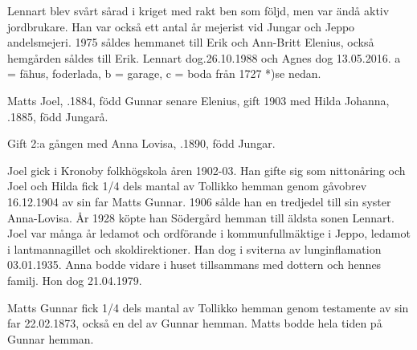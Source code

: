  Lennart blev svårt sårad i kriget med rakt ben som följd, men var ändå aktiv jordbrukare. Han var också ett antal år mejerist vid Jungar och Jeppo andelsmejeri. 1975 såldes hemmanet till Erik och Ann-Britt Elenius, också hemgården såldes till Erik. Lennart dog.26.10.1988 och Agnes dog 13.05.2016. a = fähus, foderlada, b = garage, c = boda från 1727 *)se nedan.


Matts Joel, .1884, född Gunnar senare Elenius, gift 1903 med Hilda Johanna, .1885, född Jungarå.
\begin{jhchildren}
  \item {}
  \item {}
  \item {}
  \item {}
  \item {}
\end{jhchildren}


Gift 2:a gången med Anna Lovisa, .1890, född Jungar.
\begin{jhchildren}
  \item {}
  \item {}
  \item {}
\end{jhchildren}
Joel gick i Kronoby folkhögskola åren 1902-03. Han gifte sig som nittonåring och Joel och Hilda fick 1/4 dels mantal av Tollikko hemman genom gåvobrev 16.12.1904 av sin far Matts Gunnar. 1906 sålde han en tredjedel till sin syster Anna-Lovisa. År 1928 köpte han Södergård hemman till äldsta sonen Lennart. Joel var många år ledamot och ordförande i kommunfullmäktige i Jeppo, ledamot i lantmannagillet och skoldirektioner. Han dog i sviterna av lunginflamation 03.01.1935. Anna bodde vidare i huset tillsammans med dottern och hennes familj. Hon dog 21.04.1979.


Matts Gunnar fick 1/4 dels mantal av Tollikko hemman genom testamente av sin far 22.02.1873, också en del av Gunnar hemman. Matts bodde hela tiden på Gunnar hemman.

